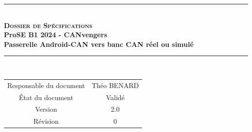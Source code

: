 \documentclass[a4paper,11pt,titlepage,french]{article}
\newcommand{\version}{2.0}
\newcommand{\revision}{0}
\newcommand{\documentName}{Dossier de Spécifications}
\newcommand{\prose}{ProSE}
\newcommand{\creator}{Théo BENARD}
\newcommand{\projectName}{Passerelle Android-CAN vers banc CAN réel ou simulé} %
\newcommand{\annee}{2024}
\newcommand{\teamName}{CANvengers}
\newcommand{\teamNumber}{B1}
\begin{document}
\makeatother
\begin{center} %
    \vspace*{2cm} %
    \rule[0.5ex]{0.7\textwidth}{0.1mm}\\ %
    \vspace*{2mm} %
        {\Huge {\textsc{\bf {\documentName}}}} %
    \vspace{0.4cm}\\ %
        {\large\bf {\prose} {\teamNumber} {\annee} - {\teamName}}\\ %
    \vspace*{1mm}
        {\large\bf {\projectName}}\\ %
    \rule[0.5ex]{0.75\textwidth}{0.1mm}\\ %
    \vspace{2cm} 
    \begin{tabular}{|c|c|} %
        \hline %
            Responsable du document & {\creator}                      \\
            État du document        & Validé                          \\
            Version                 & {\version}                      \\
            Révision                & {\revision}                     \\
        \hline
    \end{tabular}
\end{center}
\vspace{3cm} 

 

\end{document}
